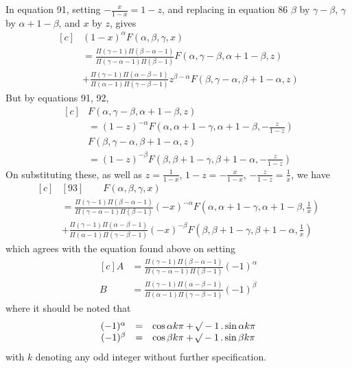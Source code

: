 In equation 91, setting \(-\frac{x}{1-x}=1-z\), and replacing in equation 86 \(\beta\) by \(\gamma-\beta\), \(\gamma\) by \(\alpha+1-\beta\), and \(x\) by \(z\), gives
\[
\begin{aligned}[c]
&(1-x)^\alpha F(\alpha,\beta,\gamma,x)\\&=
\frac{\Pi(\gamma-1)\Pi(\beta-\alpha-1)}{\Pi(\gamma-\alpha-1)\Pi(\beta-1)}F(\alpha,\gamma-\beta,\alpha+1-\beta,z)\\
&+\frac{\Pi(\gamma-1)\Pi(\alpha-\beta-1)}{\Pi(\alpha-1)\Pi(\gamma-\beta-1)}z^{\beta-\alpha}F(\beta,\gamma-\alpha,\beta+1-\alpha,z)
\end{aligned}
\]
But by equations 91, 92,
\[
\begin{aligned}[c]
&F(\alpha,\gamma-\beta,\alpha+1-\beta,z)\\&=(1-z)^{-\alpha}F\left(\alpha,\alpha+1-\gamma,\alpha+1-\beta,-\frac{z}{1-z}\right)\\[5pt]
&F(\beta,\gamma-\alpha,\beta+1-\alpha,z)\\&=(1-z)^{-\beta}F\left(\beta,\beta+1-\gamma,\beta+1-\alpha,-\frac{z}{1-z}\right)
\end{aligned}
\]
On substituting these, as well as \(z=\frac{1}{1-x}\), \(1-z=-\frac{x}{1-x}\), \(-\frac{z}{1-z}=\frac{1}{x}\), we have
\[
\begin{aligned}[c]
&[93]\qquad F(\alpha,\beta,\gamma,x)\\&=
\frac{\Pi(\gamma-1)\Pi(\beta-\alpha-1)}{\Pi(\gamma-\alpha-1)\Pi(\beta-1)}(-x)^{-\alpha}F\left(\alpha,\alpha+1-\gamma,\alpha+1-\beta,\frac{1}{x}\right)\\
&+\frac{\Pi(\gamma-1)\Pi(\alpha-\beta-1)}{\Pi(\alpha-1)\Pi(\gamma-\beta-1)}(-x)^{-\beta}F\left(\beta,\beta+1-\gamma,\beta+1-\alpha,\frac{1}{x}\right)
\end{aligned}
\]
which agrees with the equation found above on setting
\[
\begin{aligned}[c]
A&=\frac{\Pi(\gamma-1)\Pi(\beta-\alpha-1)}{\Pi(\gamma-\alpha-1)\Pi(\beta-1)}(-1)^\alpha\\
B&=\frac{\Pi(\gamma-1)\Pi(\alpha-\beta-1)}{\Pi(\alpha-1)\Pi(\gamma-\beta-1)}(-1)^\beta
\end{aligned}
\]
where it should be noted that
\[
\begin{array}{rcl}
(-1)^\alpha&=&\cos\alpha k\pi+\mathord{{}^{}\!\surd}-1\,.\sin\alpha k\pi\\
(-1)^\beta&=&\cos\beta k\pi+\mathord{{}^{}\!\surd}-1\,.\sin\beta k\pi
\end{array}
\]
with \(k\) denoting any odd integer without further specification.

